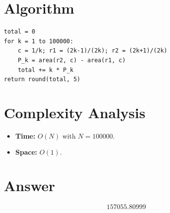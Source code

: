 \documentclass[12pt]{article}
\begin{document}
\section{Algorithm}

\begin{verbatim}
total = 0
for k = 1 to 100000:
    c = 1/k; r1 = (2k-1)/(2k); r2 = (2k+1)/(2k)
    P_k = area(r2, c) - area(r1, c)
    total += k * P_k
return round(total, 5)
\end{verbatim}

\section{Complexity Analysis}

\begin{itemize}
\item \textbf{Time:} $O(N)$ with $N = 100000$.
\item \textbf{Space:} $O(1)$.
\end{itemize}

\section{Answer}

\[
\boxed{157055.80999}
\]
\end{document}
